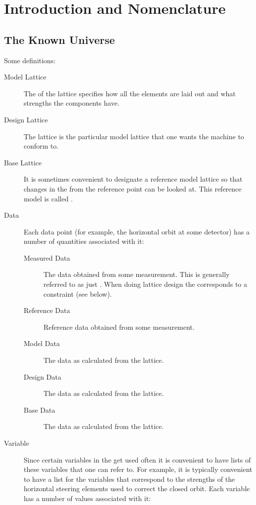 \chapter{Introduction and Nomenclature}
\label{c:nomenclature}

\section{The Known Universe}

Some definitions:
\begin{description}
\item[Model Lattice]
The  of the lattice specifies how all the elements are laid
out and what strengths the components have.
\item[Design Lattice] 
The  lattice is the particular model lattice that one wants the
machine to conform to.
\item[Base Lattice]
It is sometimes
convenient to designate a reference model lattice so that changes in the
 from the reference point can be looked at.  This reference model
is called .
\item[Data] 
Each data point (for example, the horizontal orbit at some
detector) has a number of quantities associated with it:
\begin{description}
\item[Measured Data] 
The data obtained from some measurement. This is generally referred to
as just . When doing lattice design the  corresponds to
a constraint (see below).
\item[Reference Data] 
Reference data obtained from some measurement.
\item[Model Data]
The data as calculated from the  lattice.
\item[Design Data]
The data as calculated from the  lattice.
\item[Base Data]
The data as calculated from the  lattice.
\end{description}
\item[Variable]
Since certain variables in the  get used often it is
convenient to have lists of these variables that one can refer to. For
example, it is typically convenient to have a list for the variables
that correspond to the strengths of the horizontal steering elements
used to correct the closed orbit.
Each variable has a number of values associated with it:

\end{description}
